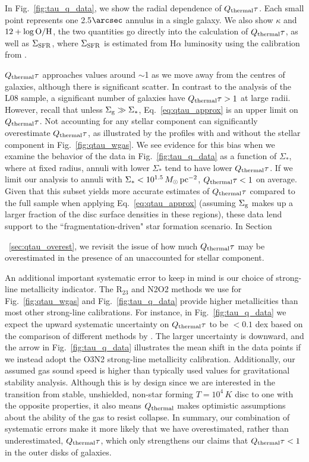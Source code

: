 \documentclass[fleqn,usenatbib]{mnras}
\newcommand{\qh}{Q_{\rm thermal}}
\begin{document}
In Fig.~\ref{fig:tau_q_data}, we show the radial dependence of $\qh\tau$. Each small point represents one 2.5$\arcsec$ annulus in a single galaxy. We also show $\kappa$ and $12+\log{\rm O/H}$, the two quantities go directly into the calculation of $\qh\tau$, as well as $\Sigma_{\rm SFR}$, where $\Sigma_{\rm SFR}$ is estimated from H$\alpha$ luminosity using the calibration from \citet{Kennicutt12}.

$\qh\tau$ approaches values around $\sim$1 as we move away from the centres of galaxies, although there is significant scatter. In contrast to the analysis of the L08 sample, a significant number of galaxies have $\qh\tau>1$ at large radii. However, recall that unless $\Sigma_{\rm g} \gg \Sigma_*$, Eq.~\ref{eq:qtau_approx} is an upper limit on $\qh\tau$.  Not accounting for any stellar component can significantly overestimate $\qh\tau$, as illustrated by the profiles with and without the stellar component in Fig.~\ref{fig:qtau_wgas}.  We see evidence for this bias when we examine the behavior of the data in Fig.~\ref{fig:tau_q_data} as a function of $\Sigma_*$, where at fixed radius, annuli with lower $\Sigma_*$ tend to have lower $\qh\tau$. If we limit our analysis to annuli with $\Sigma_*<10^{1.5}\,M_{\odot}\,{\rm pc^{-2}}$, $\qh\tau<1$ on average.  Given that this subset yields more accurate estimates of $\qh\tau$ compared to the full sample when applying Eq.~\ref{eq:qtau_approx} (assuming $\Sigma_{\rm g}$ makes up a larger fraction of the disc surface densities in these regions), these data lend support to the ``fragmentation-driven" star formation scenario.  In Section{~\ref{sec:qtau_overest}, we revisit the issue of how much $\qh\tau$ may be overestimated in the presence of an unaccounted for stellar component.
 
An additional important systematic error to keep in mind is our choice of strong-line metallicity indicator. The R$_{23}$ and N2O2 methods we use for Fig.~\ref{fig:qtau_wgas} and \mbox{Fig.~\ref{fig:tau_q_data}} provide higher metallicities than most other strong-line calibrations.  For instance, in Fig.~\ref{fig:tau_q_data} we expect the upward systematic uncertainty on $\qh\tau$ to be $<0.1$ dex based on the comparison of different methods by \mbox{\citet{Kewley08}}. The larger uncertainty is downward, and the arrow in \mbox{Fig.~\ref{fig:tau_q_data}} illustrates the mean shift in the data points if we instead adopt the O3N2 strong-line metallicity calibration.  Additionally, our assumed gas sound speed is higher than typically used values for gravitational stability analysis. Although this is by design since we are interested in the transition from stable, unshielded, non-star forming $T=10^4\,K$ disc to one with the opposite properties, it also means $\qh$ makes optimistic assumptions about the ability of the gas to resist collapse. In summary, our combination of systematic errors make it more likely that we have overestimated, rather than underestimated, $\qh\tau$, which only strengthens our claims that $\qh\tau<1$ in the outer disks of galaxies.

}
\end{document}
